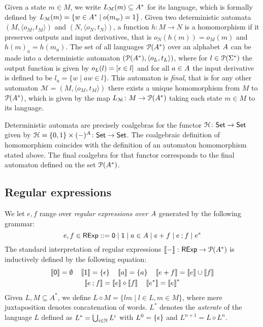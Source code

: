 Given a state $m \in M$, we write $L_{\mathcal{M}} (m) \subseteq {{A}^{\ast}}$ for its language, which is formally defined by $L_{\mathcal{M}}(m) = \{w \in {A}^\ast \mid o(m_w) = 1\}$. 
Given two deterministic automata $(M, \langle o_M, t_M \rangle)$ and $(N, \langle o_N, t_N \rangle)$, a function $h \colon M \to N$ is a homomorphism if it preserves outputs and input derivatives, that is $o_N(h(m))=o_M(m)$ and $h(m)_a = h(m_a)$. The set of all languages $\mathcal{P}({A}^{\ast})$ over an alphabet ${A}$ can be made into a deterministic automaton $(\mathcal{P}({A}^\ast), \langle o_L, t_L\rangle)$, where for $l \in \mathcal{P} (\Sigma^{\ast})$ the output function is given by $o_L(l)=[\epsilon \in l]$ and for all $a \in {A}$ the input derivative is defined to be $l_a = \{w \mid aw \in l\}$. This automaton is \emph{final}, that is for any other automaton $\mathcal{M} = (M, \langle o_M, t_M \rangle)$ there exists a unique homomorphism from $M$ to $\mathcal{P}({A}^{\ast})$, which is given by the map $L_{\mathcal{M}} \colon M \to \mathcal{P}({A}^\ast)$ taking each state $m \in M$ to its language.
\begin{remark}
	Deterministic automata are precisely coalgebras for the functor $\mathcal{H} \colon {\mathsf{Set}} \to {\mathsf{Set}}$ given by $\mathcal{H} = \{0,1\} \times (-)^{A} \colon {\mathsf{Set}} \to {\mathsf{Set}}$. The coalgebraic definition of homomorphism coincides with the definition of an automaton homomorphism stated above. The final coalgebra for that functor corresponds to the final automaton defined on the set $\mathcal{P}({A}^\ast)$.
\end{remark}
\subsection{Regular expressions}\label{c2:subsec:regular_expressions}
We let $e, f$ range over \emph{regular expressions over ${A}$} generated by the following grammar:
$$e , f \in \mathsf{RExp} ::= \mathsf{0} \mid \mathsf{1} \mid a \in {A} \mid e + f \mid e \mathbin{;} f \mid e^{\ast}$$
The standard interpretation of regular expressions $\left\llbracket{-}\right\rrbracket \colon \mathsf{RExp} \to \mathcal{P}({A}^\ast)$ is inductively defined by the following equation:
\begin{gather*}
	\left\llbracket{\mathsf{0}}\right\rrbracket = \emptyset \quad \left\llbracket{\mathsf{1}}\right\rrbracket = \{\epsilon\} \quad \left\llbracket{a}\right\rrbracket = \{ a \} \quad \left\llbracket{e + f}\right\rrbracket =  \left\llbracket{e}\right\rrbracket  \cup \left\llbracket{f}\right\rrbracket \\ \left\llbracket{e \mathbin{;}f}\right\rrbracket  = \left\llbracket{e}\right\rrbracket  \diamond \left\llbracket{f}\right\rrbracket \quad \left\llbracket{e^\ast}\right\rrbracket = \left\llbracket{e}\right\rrbracket^\ast
\end{gather*}
Given $L, M \subseteq A^\ast$, we define $L \diamond M = \{lm \mid l \in L, m \in M\}$, where mere juxtaposition denotes concatenation of words. $L^\ast$ denotes the \emph{asterate} of the language $L$ defined as $L^\ast = \bigcup_{i \in \mathbb{N}} L^i$ with $L^0 = \{\epsilon\}$ and $L^{n + 1} = L \diamond L^{n}$.
